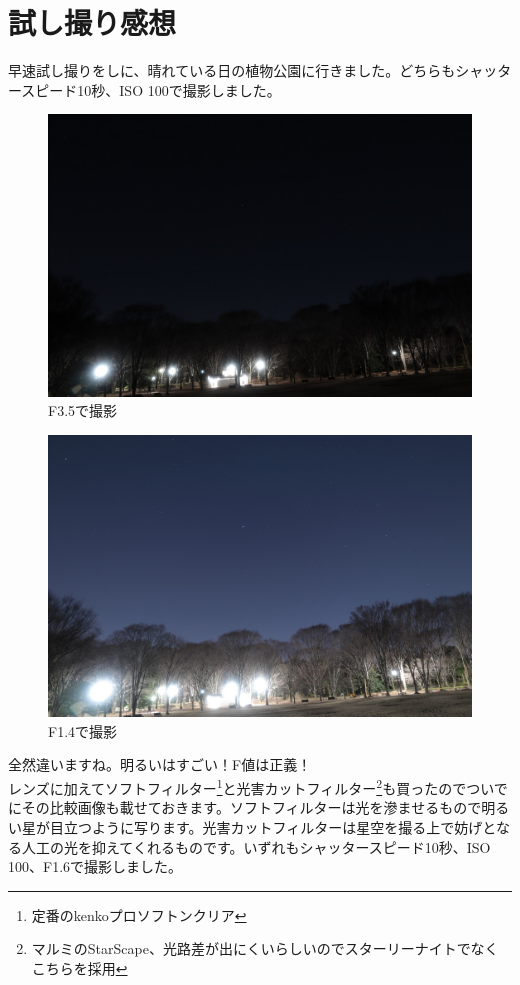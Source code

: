 \documentclass[a4paper.10pt]{jarticle}
\begin{document}
\section{試し撮り感想}
早速試し撮りをしに、晴れている日の植物公園に行きました。どちらもシャッタースピード10秒、ISO 100で撮影しました。
\begin{figure}[H]
	\begin{center}
		\includegraphics[width=12cm]{kurai.jpg}
		\caption{F3.5で撮影}
		\label{}
	\end{center}
\end{figure}
\begin{figure}[H]
	\begin{center}
		\includegraphics[width=12cm]{akarui.jpg}
		\caption{F1.4で撮影}
		\label{}
	\end{center}
\end{figure}
全然違いますね。明るいはすごい！F値は正義！\\
レンズに加えてソフトフィルター\footnote{定番のkenkoプロソフトンクリア}と光害カットフィルター\footnote{マルミのStarScape、光路差が出にくいらしいのでスターリーナイトでなくこちらを採用}も買ったのでついでにその比較画像も載せておきます。ソフトフィルターは光を滲ませるもので明るい星が目立つように写ります。光害カットフィルターは星空を撮る上で妨げとなる人工の光を抑えてくれるものです。いずれもシャッタースピード10秒、ISO 100、F1.6で撮影しました。
\end{document}
